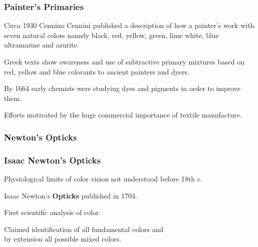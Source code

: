 \documentclass[12pt]{beamer}\usepackage[]{graphicx}\usepackage[]{color}
\begin{document}
\begin{frame}
\frametitle{Painter's Primaries}

\bbi
  \item Circa 1930 Cennino Cennini published a description of how a painter's 
  work with seven natural colors namely black, red, yellow, green, lime white,
  blue ultramarine and azurite.
  \item Greek texts show awareness and use of subtractive primary mixtures 
  based on red, yellow and blue colorants to ancient painters and dyers.
  \item By 1664 early chemists were studying dyes and pigments in order to 
  improve them.
  \item Efforts motivated by the huge commercial importance of textile 
  manufacture.
\ei

\end{frame}


\begin{frame}
\begin{center}
\Huge{}
\end{center}
\end{frame}


\begin{frame}
\frametitle{Newton's Opticks}
\begin{center}
\end{center}
\end{frame}


\begin{frame}
\frametitle{Isaac Newton's Opticks}

\bbi
  \item Physiological limits of color vision not understood before 18th c.
  \item Isaac Newton's \textbf{Opticks} published in 1704.
  \item First scientific analysis of color.
  \item Claimed identification of all fundamental colors and \\
  by extension all possible mixed colors.
\ei

\end{frame}
\end{document}
